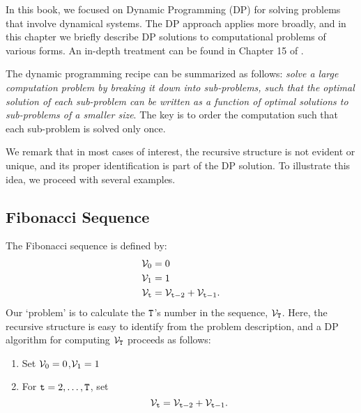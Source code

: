 In this book, we focused on Dynamic Programming (DP) for solving problems that involve dynamical systems. The DP approach applies more broadly, and in this chapter we briefly describe DP solutions to computational problems of various forms. An in-depth treatment can be found in Chapter 15 of \cite{BookCormenLRS2009}.


The dynamic programming recipe can be summarized as follows: \textit{solve a large computation problem by breaking it down into sub-problems, such that the optimal solution of each sub-problem can be written as a function of optimal solutions to sub-problems of a smaller size}. The key is to order the computation such that each sub-problem is solved only once.

We remark that in most cases of interest, the recursive structure is not evident or unique, and its proper identification is part of the DP solution. To illustrate this idea, we proceed with several examples.

\subsection*{Fibonacci Sequence}
The Fibonacci sequence is defined by:
\begin{equation*}
    \begin{split}
        \mathcal{V}_{0} &= 0 \\ 
        \mathcal{V}_1 &= 1 \\
        \mathcal{V}_{{\tt t}} &= \mathcal{V}_{{{\tt t}}-2} + \mathcal{V}_{{{\tt t}}-1}.
    \end{split}
\end{equation*}
Our `problem' is to calculate the ${\tt T}$'s number in the sequence, $\mathcal{V}_{{\tt T}}$. Here, the recursive structure is easy to identify from the problem description, and a DP algorithm for computing $\mathcal{V}_{{\tt T}}$ proceeds as follows:

\begin{enumerate}
    \item Set $\mathcal{V}_{0} = 0$,$\mathcal{V}_1 = 1$ 
    \item For ${\tt t} = 2, \ldots, {\tt T}$, set
    \begin{equation*}
        \mathcal{V}_{{\tt t}} = \mathcal{V}_{{{\tt t}}-2} + \mathcal{V}_{{{\tt t}}-1}.
    \end{equation*}
\end{enumerate}

